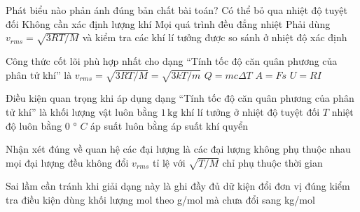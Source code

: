 \begin{ex}
Phát biểu nào phản ánh đúng bản chất bài toán?
\choice
{Có thể bỏ qua nhiệt độ tuyệt đối}
{Không cần xác định lượng khí}
{Mọi quá trình đều đẳng nhiệt}
{\True Phải dùng $v_{rms}=\sqrt{3RT/M}$ và kiểm tra các khí lí tưởng được so sánh ở nhiệt độ xác định}
\end{ex}

\begin{ex}
Công thức cốt lõi phù hợp nhất cho dạng “Tính tốc độ căn quân phương của phân tử khí” là
\choice
{\True $v_{rms}=\sqrt{3RT/M}=\sqrt{3kT/m}$}
{$Q=mc\Delta T$}
{$A=Fs$}
{$U=RI$}
\end{ex}

\begin{ex}
Điều kiện quan trọng khi áp dụng dạng “Tính tốc độ căn quân phương của phân tử khí” là
\choice
{khối lượng vật luôn bằng $1\,\text{kg}$}
{\True khí lí tưởng ở nhiệt độ tuyệt đối $T$}
{nhiệt độ luôn bằng 0 ° $C$}
{áp suất luôn bằng áp suất khí quyển}
\end{ex}

\begin{ex}
Nhận xét đúng về quan hệ các đại lượng là
\choice
{các đại lượng không phụ thuộc nhau}
{mọi đại lượng đều không đổi}
{\True $v_{rms}$ tỉ lệ với $\sqrt{T/M}$}
{chỉ phụ thuộc thời gian}
\end{ex}

\begin{ex}
Sai lầm cần tránh khi giải dạng này là
\choice
{ghi đầy đủ dữ kiện}
{đổi đơn vị đúng}
{kiểm tra điều kiện}
{\True dùng khối lượng mol theo g/mol mà chưa đổi sang kg/mol}
\end{ex}

